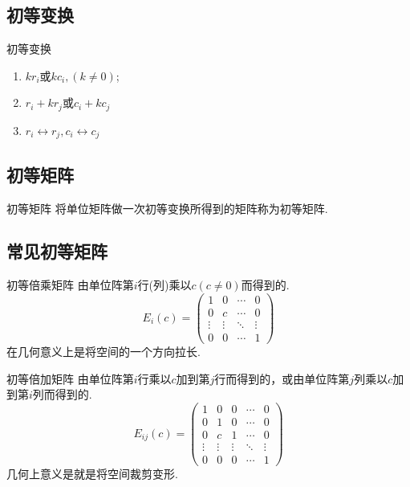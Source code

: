 \documentclass[lang=cn,10pt]{elegantbook}
\begin{document}
\subsection{初等变换}
\begin{definition}{初等变换}
    \begin{enumerate}
        \item $kr_i$或$kc_i,(k \ne 0)$;
        \item $r_i + kr_j$或$c_i+kc_j$
        \item $r_i \longleftrightarrow r_j,c_i \longleftrightarrow c_j$
    \end{enumerate}
\end{definition}

\subsection{初等矩阵}
\begin{definition}{初等矩阵}
    将单位矩阵做一次初等变换所得到的矩阵称为初等矩阵.
\end{definition}

\subsection{常见初等矩阵}
\begin{definition}{初等倍乘矩阵}
由单位阵第$i$行(列)乘以$c(c \ne 0)$而得到的.
    \begin{equation}
        E_i(c) = \begin{pmatrix}
            1&0&\cdots&0\\
            0&c&\cdots&0\\
            \vdots&\vdots&\ddots&\vdots\\
            0&0&\cdots&1
        \end{pmatrix}
    \end{equation}
在几何意义上是将空间的一个方向拉长.
\end{definition}

\begin{definition}{初等倍加矩阵}
由单位阵第$i$行乘以$c$加到第$j$行而得到的，或由单位阵第$j$列乘以$c$加到第$i$列而得到的.
    \begin{equation}
        E_{ij}(c) = \begin{pmatrix}
            1&0&0&\cdots&0\\
            0&1&0&\cdots&0\\
            0&c&1&\cdots&0\\
            \vdots&\vdots&\vdots&\ddots&\vdots\\
            0&0&0&\cdots&1
        \end{pmatrix}
    \end{equation}
    几何上意义是就是将空间裁剪变形.
\end{definition}
\end{document}
